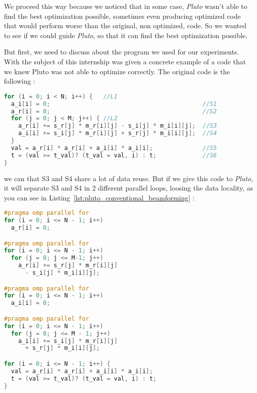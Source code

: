 \documentclass[paper=a4, fontsize=11.5pt]{scrartcl}
\numberwithin{equation}{section}        %
\numberwithin{figure}{section}          %
\numberwithin{table}{section}               %
\begin{document}
We proceed this way because we noticed that in some case, \textit{Pluto} wasn't able
to find the best optimization possible, sometimes even producing optimized code that would
perform worse than the original, non optimized, code. So we wanted to see if we could
guide \textit{Pluto}, so that it can find the best optimization possible.

But first, we need to discuss about the program we used for our experiments. With the subject
of this internship was given a concrete example of a code that we knew Pluto was not able to optimize correctly.
The original code is the following :
\begin{lstlisting}[frame=single, language=C, caption={Origin Conventional Beamforming kernel}, label={lst:original_conventional_beamforming}]
for (i = 0; i < N; i++) {   //L1
  a_i[i] = 0;                                           //S1
  a_r[i] = 0;                                           //S2
  for (j = 0; j < M; j++) { //L2
    a_r[i] += s_r[j] * m_r[i][j] - s_i[j] * m_i[i][j];  //S3
    a_i[i] += s_i[j] * m_r[i][j] + s_r[j] * m_i[i][j];  //S4
  }
  val = a_r[i] * a_r[i] + a_i[i] * a_i[i];              //S5
  t = (val >= t_val)? (t_val = val, i) : t;             //S6
}
\end{lstlisting}
we can that S3 and S4 share a lot of data reuse. But if we give this code to \textit{Pluto},
it will separate S3 and S4 in 2 different parallel loops, loosing the data locality, as you
can see in Listing~\ref{lst:pluto_conventional_beamforming} :
\begin{minipage}[t]{0.45\textwidth}
\begin{lstlisting}[frame=single, language=C, basicstyle=\scriptsize, caption={Conventional Beamforming kernel optimized by Pluto}, label={lst:pluto_conventional_beamforming}]
#pragma omp parallel for
for (i = 0; i <= N - 1; i++)
  a_r[i] = 0;

#pragma omp parallel for
for (i = 0; i <= N - 1; i++)
  for (j = 0; j <= M-1; j++)
    a_r[i] += s_r[j] * m_r[i][j]
      - s_i[j] * m_i[i][j];

#pragma omp parallel for
for (i = 0; i <= N - 1; i++)
  a_i[i] = 0;

#pragma omp parallel for
for (i = 0; i <= N - 1; i++)
  for (j = 0; j <= M - 1; j++)
    a_i[i] += s_i[j] * m_r[i][j]
      + s_r[j] * m_i[i][j];

for (i = 0; i <= N - 1; i++) {
  val = a_r[i] * a_r[i] + a_i[i] * a_i[i];
  t = (val >= t_val)? (t_val = val, i) : t;
}
\end{lstlisting}
\end{minipage}
\end{document}
